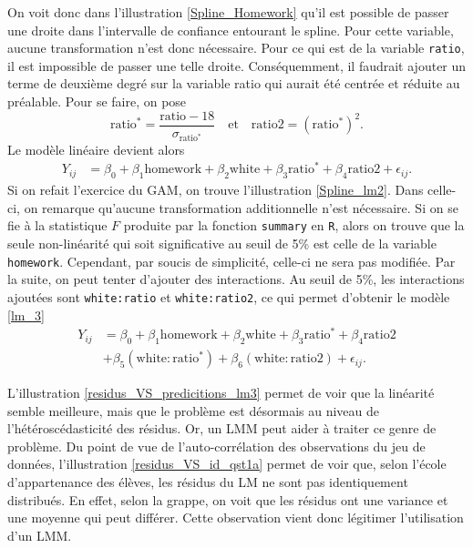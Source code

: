 \documentclass{article}
\begin{document}
		On voit donc dans l'illustration \ref{Spline_Homework} qu'il est possible de passer une droite dans l'intervalle de confiance entourant le spline. Pour cette variable, aucune transformation n'est donc nécessaire. Pour ce qui est de la variable \texttt{ratio}, il est impossible de passer une telle droite. Conséquemment, il faudrait ajouter un terme de deuxième degré sur la variable ratio qui aurait été centrée et réduite au préalable. Pour se faire, on pose
		$$ 
		\mathrm{ratio^*} = \frac{\mathrm{ratio}-18}{ \sigma_{\mathrm{ratio^*}}} 
		\quad\text{et}\quad
		\mathrm{ratio2} = (\mathrm{ratio^*})^2.
		$$
		Le modèle linéaire devient alors
		\begin{align}\label{lm_2}
				Y_{ij} &= \beta_0 + \beta_1 \mathrm{homework} + \beta_2 \mathrm{white} + \beta_3 \mathrm{ratio^*} + \beta_4 \mathrm{ratio2} + \epsilon_{ij}.
		\end{align}
		Si on refait l'exercice du GAM, on trouve l'illustration \ref{Spline_lm2}. Dans celle-ci, on remarque qu'aucune transformation additionnelle n'est nécessaire.
		Si on se fie à la statistique $F$ produite par la fonction \texttt{summary} en \texttt{R}, alors on trouve que la seule non-linéarité qui soit significative au seuil de 5\% est celle de la variable \texttt{homework}. Cependant, par soucis de simplicité, celle-ci ne sera pas modifiée. Par la suite, on peut tenter d'ajouter des interactions.
		Au seuil de 5\%, les interactions ajoutées sont \texttt{white:ratio} et \texttt{white:ratio2}, ce qui permet d'obtenir le modèle \eqref{lm_3}
		\begin{align}\label{lm_3}
			Y_{ij} &= \beta_0 + \beta_1 \mathrm{homework} + \beta_2 \mathrm{white} + \beta_3 \mathrm{ratio^*} + \beta_4 \mathrm{ratio2}\\
			 &+ \beta_5 (\mathrm{white:ratio^*}) + \beta_6 (\mathrm{white:ratio2}) + \epsilon_{ij}. \nonumber
		\end{align}
		
		L'illustration \ref{residus_VS_predicitions_lm3} permet de voir que la linéarité semble meilleure, mais que le problème est désormais au niveau de l'hétéroscédasticité des résidus. Or, un LMM peut aider à traiter ce genre de problème. Du point de vue de l'auto-corrélation des observations du jeu de données, l'illustration \ref{residus_VS_id_qst1a} permet de voir que, selon l'école d'appartenance des élèves, les résidus du LM ne sont pas identiquement distribués. En effet, selon la grappe, on voit que les résidus ont une variance et une moyenne qui peut différer. Cette observation vient donc légitimer l'utilisation d'un LMM.
		
\end{document}
